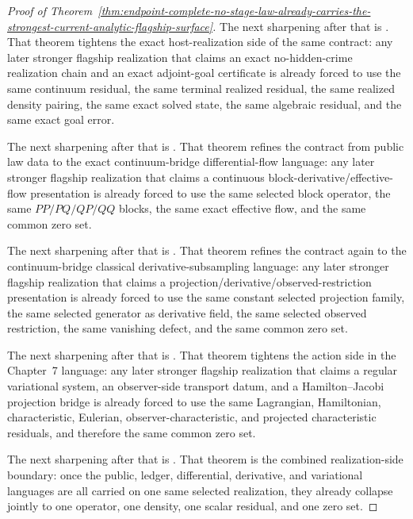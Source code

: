 \begin{proof}[Proof of Theorem~\ref{thm:endpoint-complete-no-stage-law-already-carries-the-strongest-current-analytic-flagship-surface}]
The next sharpening after that is
.
That theorem tightens the exact host-realization side of the same contract:
any later stronger flagship realization that claims an exact no-hidden-crime
realization chain and an exact adjoint-goal certificate is already forced to
use the same continuum residual, the same terminal realized residual, the same
realized density pairing, the same exact solved state, the same algebraic
residual, and the same exact goal error.

The next sharpening after that is
.
That theorem refines the contract from public law data to the exact
continuum-bridge
differential-flow language: any later stronger flagship realization that
claims a continuous block-derivative/effective-flow presentation is already
forced to use the same selected block operator, the same \(PP/PQ/QP/QQ\)
blocks, the same exact effective flow, and the same common zero set.

The next sharpening after that is
.
That theorem refines the contract again to the continuum-bridge classical
derivative-subsampling language: any later stronger flagship realization that
claims a projection/derivative/observed-restriction presentation is already
forced to use the same constant selected projection family, the same selected
generator as derivative field, the same selected observed restriction, the
same vanishing defect, and the same common zero set.

The next sharpening after that is
.
That theorem tightens the action side in the Chapter~7 language: any later
stronger flagship realization that claims a regular variational system, an
observer-side transport datum, and a Hamilton--Jacobi projection bridge is
already forced to use the same Lagrangian, Hamiltonian, characteristic,
Eulerian, observer-characteristic, and projected characteristic residuals,
and therefore the same common zero set.

The next sharpening after that is
.
That theorem is the combined realization-side boundary: once the public,
ledger, differential, derivative, and variational languages are all carried on
one same selected realization, they already collapse jointly to one operator,
one density, one scalar residual, and one zero set.


\end{proof}
